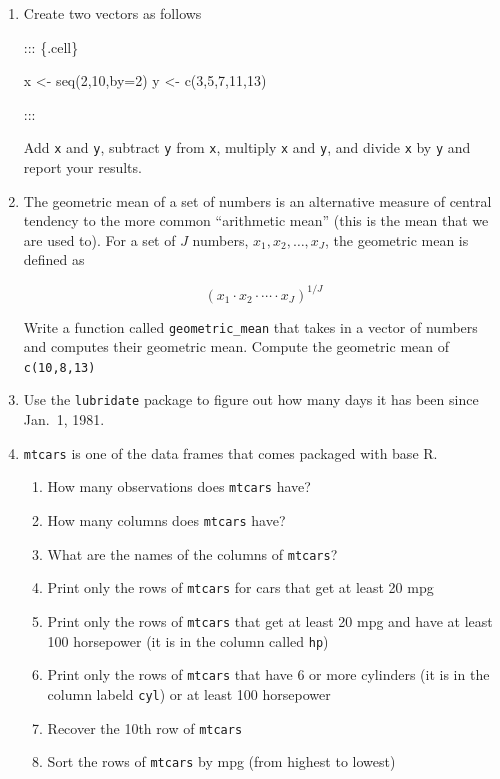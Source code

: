 \documentclass[
  letterpaper,
  DIV=11,
  numbers=noendperiod]{scrreprt}
\newenvironment{Shaded}{\begin{snugshade}}{\end{snugshade}}
\newcommand{\AttributeTok}[1]{\textcolor[rgb]{0.40,0.45,0.13}{#1}}
\newcommand{\DecValTok}[1]{\textcolor[rgb]{0.68,0.00,0.00}{#1}}
\newcommand{\FunctionTok}[1]{\textcolor[rgb]{0.28,0.35,0.67}{#1}}
\newcommand{\NormalTok}[1]{\textcolor[rgb]{0.00,0.23,0.31}{#1}}
\newcommand{\OtherTok}[1]{\textcolor[rgb]{0.00,0.23,0.31}{#1}}
\begin{document}
\begin{enumerate}
\def\labelenumi{\arabic{enumi}.}
\item
  Create two vectors as follows

  ::: \{.cell\}

\begin{Shaded}
\begin{Highlighting}[]
\NormalTok{x }\OtherTok{\textless{}{-}} \FunctionTok{seq}\NormalTok{(}\DecValTok{2}\NormalTok{,}\DecValTok{10}\NormalTok{,}\AttributeTok{by=}\DecValTok{2}\NormalTok{)}
\NormalTok{y }\OtherTok{\textless{}{-}} \FunctionTok{c}\NormalTok{(}\DecValTok{3}\NormalTok{,}\DecValTok{5}\NormalTok{,}\DecValTok{7}\NormalTok{,}\DecValTok{11}\NormalTok{,}\DecValTok{13}\NormalTok{)}
\end{Highlighting}
\end{Shaded}

  :::

  Add \texttt{x} and \texttt{y}, subtract \texttt{y} from \texttt{x},
  multiply \texttt{x} and \texttt{y}, and divide \texttt{x} by
  \texttt{y} and report your results.
\item
  The geometric mean of a set of numbers is an alternative measure of
  central tendency to the more common ``arithmetic mean'' (this is the
  mean that we are used to). For a set of \(J\) numbers,
  \(x_1,x_2,\ldots,x_J\), the geometric mean is defined as

  \[
     (x_1 \cdot x_2 \cdot \cdots \cdot x_J)^{1/J}
   \]

  Write a function called \texttt{geometric\_mean} that takes in a
  vector of numbers and computes their geometric mean. Compute the
  geometric mean of \texttt{c(10,8,13)}
\item
  Use the \texttt{lubridate} package to figure out how many days it has
  been since Jan.~1, 1981.
\item
  \texttt{mtcars} is one of the data frames that comes packaged with
  base R.

  \begin{enumerate}
  \def\labelenumii{\alph{enumii})}
  \item
    How many observations does \texttt{mtcars} have?
  \item
    How many columns does \texttt{mtcars} have?
  \item
    What are the names of the columns of \texttt{mtcars}?
  \item
    Print only the rows of \texttt{mtcars} for cars that get at least 20
    mpg
  \item
    Print only the rows of \texttt{mtcars} that get at least 20 mpg and
    have at least 100 horsepower (it is in the column called
    \texttt{hp})
  \item
    Print only the rows of \texttt{mtcars} that have 6 or more cylinders
    (it is in the column labeld \texttt{cyl}) or at least 100 horsepower
  \item
    Recover the 10th row of \texttt{mtcars}
  \item
    Sort the rows of \texttt{mtcars} by mpg (from highest to lowest)
  \end{enumerate}
\end{enumerate}
\end{document}
